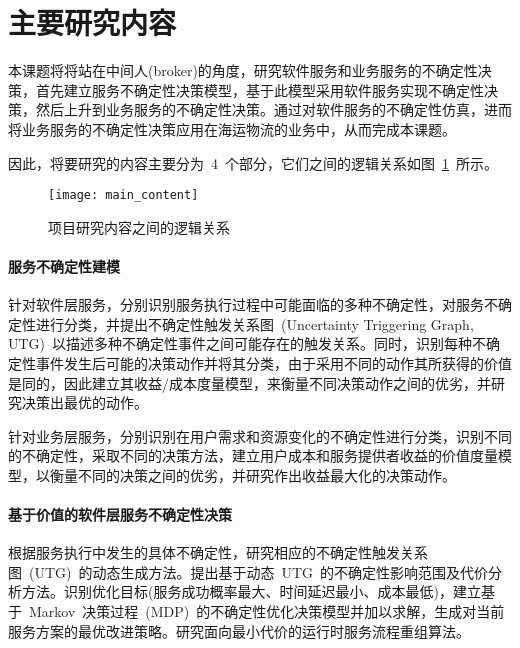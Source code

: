 \section{主要研究内容}

本课题将将站在中间人(broker)的角度，研究软件服务和业务服务的不确定性决策，首先建立服务不确定性决策模型，基于此模型采用软件服务实现不确定性决策，然后上升到业务服务的不确定性决策。通过对软件服务的不确定性仿真，进而将业务服务的不确定性决策应用在海运物流的业务中，从而完成本课题。

因此，将要研究的内容主要分为~4~个部分，它们之间的逻辑关系如图~\ref{main_content}~所示。

\begin{figure}[htbp]
    \centering
    \texttt{[image: main\_content]}
    \caption{项目研究内容之间的逻辑关系}\label{main_content}
    \vspace{-1em}
\end{figure}

\setcounter{paragraph}{0}

\paragraph{服务不确定性建模}

针对软件层服务，分别识别服务执行过程中可能面临的多种不确定性，对服务不确定性进行分类，并提出不确定性触发关系图~(Uncertainty Triggering Graph, UTG)~以描述多种不确定性事件之间可能存在的触发关系。同时，识别每种不确定性事件发生后可能的决策动作并将其分类，由于采用不同的动作其所获得的价值是同的，因此建立其收益/成本度量模型，来衡量不同决策动作之间的优劣，并研究决策出最优的动作。

针对业务层服务，分别识别在用户需求和资源变化的不确定性进行分类，识别不同的不确定性，采取不同的决策方法，建立用户成本和服务提供者收益的价值度量模型，以衡量不同的决策之间的优劣，并研究作出收益最大化的决策动作。

\paragraph{基于价值的软件层服务不确定性决策}

根据服务执行中发生的具体不确定性，研究相应的不确定性触发关系图~(UTG)~的动态生成方法。提出基于动态~UTG~的不确定性影响范围及代价分析方法。识别优化目标(服务成功概率最大、时间延迟最小、成本最低)，建立基于~Markov~决策过程~(MDP)~的不确定性优化决策模型并加以求解，生成对当前服务方案的最优改进策略。研究面向最小代价的运行时服务流程重组算法。

